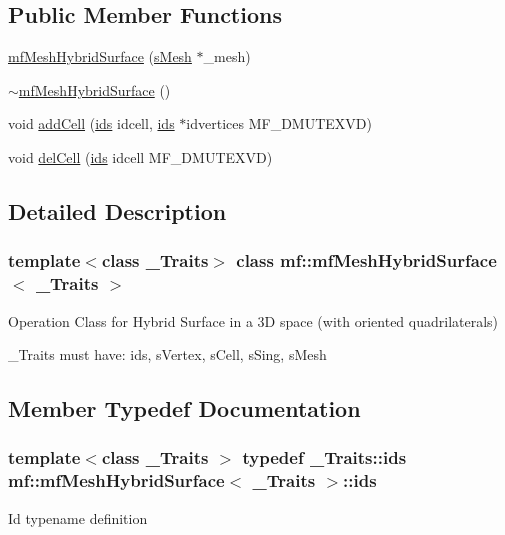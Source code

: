 \subsection*{Public Member Functions}
\begin{DoxyCompactItemize}
\item 
\hyperlink{classmf_1_1mfMeshHybridSurface_afa40a6d452119c868d4996e3ec42dc0a}{mfMeshHybridSurface} (\hyperlink{classmf_1_1mfMeshHybridSurface_a204a2dcbd0802b263253055d7d2d1b9a}{sMesh} $\ast$\_\-mesh)
\item 
\hyperlink{classmf_1_1mfMeshHybridSurface_af72771dbaf0d5235ade66fe38308f872}{$\sim$mfMeshHybridSurface} ()
\item 
void \hyperlink{classmf_1_1mfMeshHybridSurface_a970d678d03168429e492eed98064602f}{addCell} (\hyperlink{classmf_1_1mfMeshHybridSurface_a46dd7994ecadd8ead204ab52dcb632ca}{ids} idcell, \hyperlink{classmf_1_1mfMeshHybridSurface_a46dd7994ecadd8ead204ab52dcb632ca}{ids} $\ast$idvertices MF\_\-DMUTEXVD)
\item 
void \hyperlink{classmf_1_1mfMeshHybridSurface_aa6726532e75edd42143a477d4036f9ad}{delCell} (\hyperlink{classmf_1_1mfMeshHybridSurface_a46dd7994ecadd8ead204ab52dcb632ca}{ids} idcell MF\_\-DMUTEXVD)
\end{DoxyCompactItemize}


\subsection{Detailed Description}
\subsubsection*{template$<$class \_\-Traits$>$ class mf::mfMeshHybridSurface$<$ \_\-Traits $>$}

Operation Class for Hybrid Surface in a 3D space (with oriented quadrilaterals)

\_\-Traits must have: ids, sVertex, sCell, sSing, sMesh 

\subsection{Member Typedef Documentation}
\hypertarget{classmf_1_1mfMeshHybridSurface_a46dd7994ecadd8ead204ab52dcb632ca}{
\subsubsection[{ids}]{\setlength{\rightskip}{0pt plus 5cm}template$<$class \_\-Traits $>$ typedef \_\-Traits::ids {\bf mf::mfMeshHybridSurface}$<$ \_\-Traits $>$::{\bf ids}}}
\label{classmf_1_1mfMeshHybridSurface_a46dd7994ecadd8ead204ab52dcb632ca}
Id typename definition 

